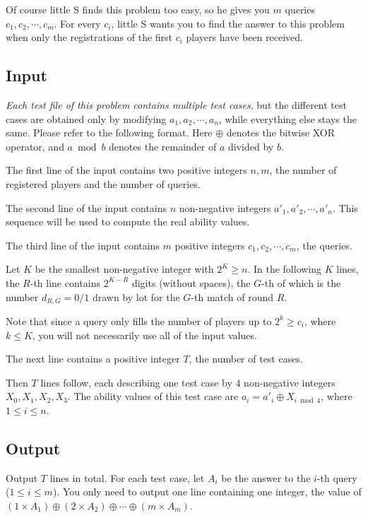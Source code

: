\documentclass[11pt]{article}
\begin{document}
Of course little S finds this problem too easy, so he gives you $m$
queries $c_1, c_2, \cdots, c_m$.
For every $c_i$, little S wants you to find the answer to this problem when
only the registrations of the first $c_i$ players have been received.

\subsection*{Input}

\emph{Each test file of this problem contains multiple test cases}, but the
different test cases are obtained only by modifying
$a_1, a_2, \cdots, a_n$, while everything else stays the same.
Please refer to the following format.
Here $\oplus$ denotes the bitwise XOR operator, and $a \bmod b$ denotes the
remainder of $a$ divided by $b$.

The first line of the input contains two positive integers $n, m$, the
number of registered players and the number of queries.

The second line of the input contains $n$ non-negative integers
$a'_1, a'_2, \cdots, a'_n$.
This sequence will be used to compute the real ability values.

The third line of the input contains $m$ positive integers
$c_1, c_2, \cdots, c_m$, the queries.

Let $K$ be the smallest non-negative integer with $2^K \ge n$.
In the following $K$ lines, the $R$-th line contains $2^{K-R}$ digits
(without spaces), the $G$-th of which is the number
$d_{R,G} = 0/1$ drawn by lot for the $G$-th match of round $R$.

Note that since a query only fills the number of players up to
$2^k \ge c_i$, where $k \le K$, you will not necessarily use all of the
input values.

The next line contains a positive integer $T$, the number of test cases.

Then $T$ lines follow, each describing one test case by $4$ non-negative
integers $X_0, X_1, X_2, X_3$.
The ability values of this test case are
$a_i = a'_i \oplus X_{i \bmod 4}$, where $1 \le i \le n$.

\subsection*{Output}

Output $T$ lines in total.
For each test case, let $A_i$ be the answer to the $i$-th query
($1 \le i \le m$).
You only need to output one line containing one integer, the value of
$(1 \times A_1) \oplus (2 \times A_2) \oplus \cdots \oplus (m \times A_m)$.
\end{document}
